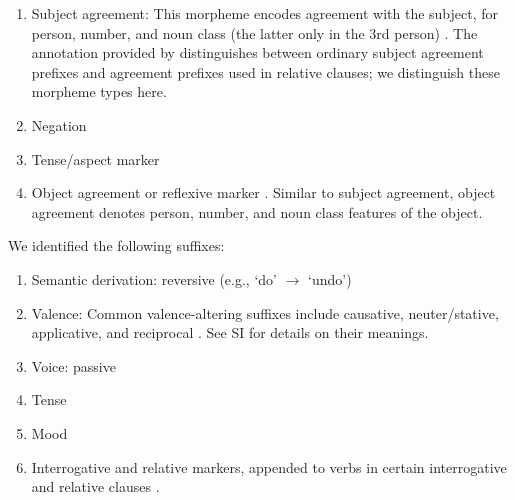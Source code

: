 \documentclass[11pt,letterpaper]{article}
\begin{document}
\begin{enumerate}
    \item Subject agreement: This morpheme encodes agreement with the subject, for person, number, and noun class (the latter only in the 3rd person) \cite[]{doke1967textbook}.
            The annotation provided by \cite{demuth1992acquisition} distinguishes between ordinary subject agreement prefixes and agreement prefixes used in relative clauses; we distinguish these morpheme types here.

    \item Negation \citep[]{doke1967textbook}

    \item Tense/aspect marker   \citep[--424]{doke1967textbook}

    \item Object agreement or reflexive marker \citep[]{doke1967textbook}.
    Similar to subject agreement, object agreement denotes person, number, and noun class features of the object.
\end{enumerate}
We identified the following suffixes:


\begin{enumerate}
\item Semantic derivation: reversive (e.g., `do' $\rightarrow$ `undo') \citep[]{doke1967textbook}
\item Valence: Common valence-altering suffixes include causative, neuter/stative, applicative, and reciprocal \citep[--338]{doke1967textbook}. See SI for details on their meanings.
    \item Voice: passive \citep[]{doke1967textbook}
    \item Tense \citep[]{doke1967textbook}
    \item Mood \citep[--445]{doke1967textbook}
    \item Interrogative and relative markers, appended to verbs in certain interrogative and relative clauses \citep[, 271, 320, 714, 793]{doke1967textbook}.
\end{enumerate}
\end{document}
